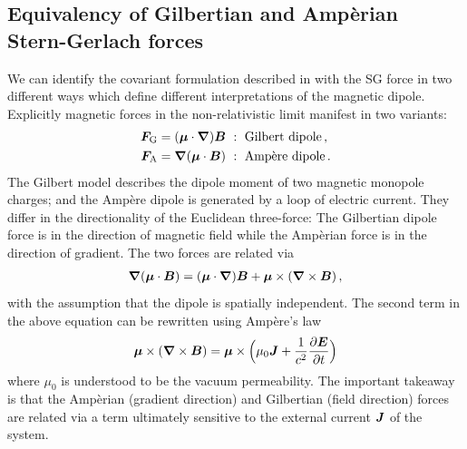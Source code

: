 \subsection{Equivalency of Gilbertian and Amp{\`e}rian Stern-Gerlach forces}
\label{sec:ampgil}
We can identify the covariant formulation described in  with the SG force in two different ways which define different interpretations of the magnetic dipole. Explicitly magnetic forces in the non-relativistic limit manifest in two variants:
\begin{alignat}{1}
\label{gil:0}
\bb{F}_\mathrm{G} = (\bb{\mu}\cdot\bb{\nabla})\bb{B}\ &:\ \mathrm{Gilbert\ dipole}\,,\\
\label{amp:0}
\bb{F}_\mathrm{A} =\bb{\nabla}(\bb{\mu}\cdot\bb{B})\ &:\ \mathrm{Amp\grave{e}re\ dipole}\,.
\end{alignat}
The Gilbert model describes the dipole moment of two magnetic monopole charges; and the Amp{\`e}re dipole is generated by a loop of electric current. They differ in the directionality of the Euclidean three-force: The Gilbertian dipole force is in the direction of magnetic field while the Amp{\`e}rian force is in the direction of gradient. The two forces are related via
\begin{alignat}{1}
\label{grad:1}
\boldsymbol{\nabla}(\boldsymbol{\mu}\cdot\boldsymbol{B}) = (\boldsymbol{\mu}\cdot\boldsymbol{\nabla})\boldsymbol{B}+\boldsymbol{\mu}\times(\boldsymbol{\nabla}\times\boldsymbol{B})\,,
\end{alignat}
with the assumption that the dipole is spatially independent. The second term in the above equation can be rewritten using Amp{\`e}re's law
\begin{alignat}{1}
\label{grad:2}
\boldsymbol{\mu}\times(\boldsymbol{\nabla}\times\boldsymbol{B}) = \boldsymbol{\mu}\times\Big(\mu_{0}\boldsymbol{J}+\frac{1}{c^{2}}\frac{\partial\boldsymbol{E}}{\partial t}\Big)
\end{alignat}
where $\mu_{0}$ is understood to be the vacuum permeability. The important takeaway is that the Amp{\`e}rian (gradient direction) and Gilbertian (field direction) forces are related via a term ultimately sensitive to the external current $\boldsymbol{J}$ of the system.

